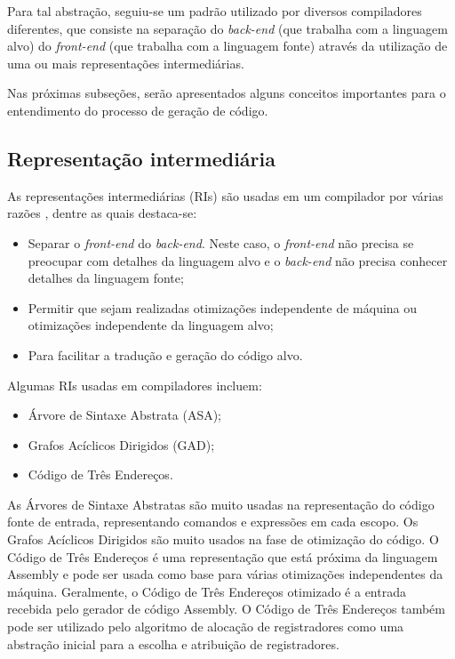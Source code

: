 \documentclass[
	12pt,				%
	openright,			%
	oneside,			%
	a4paper,			%
	main=brazil,
	english,			%
	]{ufsj-abntex2}
\begin{document}
Para tal abstração, seguiu-se um padrão utilizado por diversos compiladores diferentes, que consiste na separação do \textit{back-end} (que trabalha com a linguagem alvo) do \textit{front-end} (que trabalha com a linguagem fonte) através da utilização de uma ou mais representações intermediárias. 

Nas próximas subseções, serão apresentados alguns conceitos importantes para o entendimento do processo de geração de código. 

\subsection{Representação intermediária}

As representações intermediárias (RIs) são usadas em um compilador por várias razões \cite{dragonBook}, dentre as quais destaca-se: 
\begin{itemize}
    \item Separar o \textit{front-end} do \textit{back-end}. Neste caso, o \textit{front-end} não precisa se preocupar com detalhes da linguagem alvo e o \textit{back-end} não precisa conhecer detalhes da linguagem fonte;
    \item Permitir que sejam realizadas otimizações independente de máquina ou otimizações independente da linguagem alvo; 
    \item Para facilitar a tradução e geração do código alvo.    
\end{itemize}

Algumas RIs usadas em compiladores incluem:  
\begin{itemize}
    \item Árvore de Sintaxe Abstrata (ASA); 
    \item Grafos Acíclicos Dirigidos (GAD); 
    \item Código de Três Endereços. 
\end{itemize}

As Árvores de Sintaxe Abstratas são muito usadas na representação do código fonte de entrada, representando comandos e expressões em cada escopo. Os Grafos Acíclicos Dirigidos são muito usados na fase de otimização do código. O Código de Três Endereços é uma representação que está próxima da linguagem Assembly e pode ser usada como base para várias otimizações independentes da máquina. Geralmente, o Código de Três Endereços otimizado é a entrada recebida pelo gerador de código Assembly. O Código de Três Endereços também pode ser utilizado pelo algoritmo de alocação de registradores como uma abstração inicial para a escolha e atribuição de registradores.    
\end{document}
